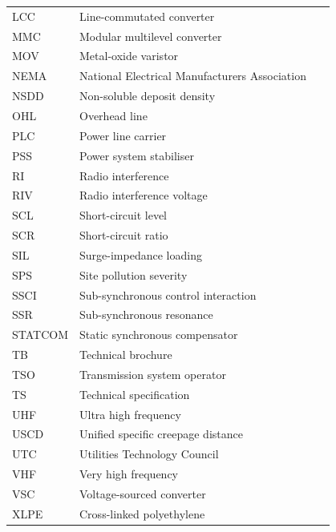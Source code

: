 \begin{longtable}{@{}l p{0.80\linewidth}@{}}
  LCC   & Line-commutated converter \\
  MMC   & Modular multilevel converter \\
  MOV   & Metal-oxide varistor \\
  NEMA  & National Electrical Manufacturers Association \\
  NSDD  & Non-soluble deposit density \\
  OHL   & Overhead line \\
  PLC   & Power line carrier \\
  PSS   & Power system stabiliser \\
  RI    & Radio interference \\
  RIV   & Radio interference voltage \\
  SCL   & Short-circuit level \\
  SCR   & Short-circuit ratio \\
  SIL   & Surge-impedance loading \\
  SPS   & Site pollution severity \\
  SSCI  & Sub-synchronous control interaction \\
  SSR   & Sub-synchronous resonance \\
  STATCOM & Static synchronous compensator \\
  TB    & Technical brochure \\
  TSO   & Transmission system operator \\
  TS    & Technical specification \\
  UHF   & Ultra high frequency \\
  USCD  & Unified specific creepage distance \\
  UTC   & Utilities Technology Council \\
  VHF   & Very high frequency \\
  VSC   & Voltage-sourced converter \\
  XLPE  & Cross-linked polyethylene \\
  \bottomrule
\end{longtable}
